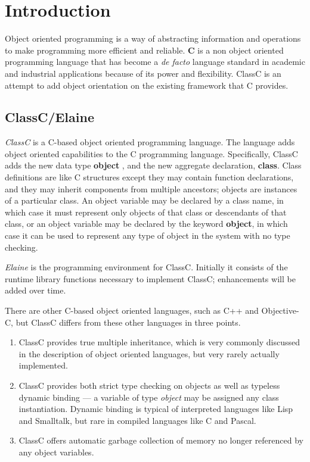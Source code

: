 \section{Introduction}
Object oriented programming is a way of abstracting information and
operations to make programming more efficient and reliable.
{\bf C}
is a non object oriented programming language that has become a {\em de facto}
language standard in academic and industrial applications because of its
power and flexibility.  ClassC is an attempt to add object orientation
on the existing framework that C provides.

\subsection{ClassC/Elaine}
{\em ClassC} is a C-based object oriented programming language.  The language
adds object oriented capabilities to the C programming language.
Specifically, ClassC adds the new data type
{\bf object}
, and the new aggregate declaration,
{\bf class}.
Class definitions are like C
structures except they may contain function declarations, and they may
inherit components from multiple ancestors; objects are instances of
a particular class.  An object variable may be declared by a class name,
in which case it must represent only objects of that class or descendants
of that class, or an object variable may be declared by the keyword
{\bf object},
in which case it can be used to represent any type of object in
the system with no type checking.

{\em Elaine}
is the programming environment for ClassC.  Initially it
consists of the runtime library functions necessary to implement
ClassC; enhancements will be added over time.

There are other C-based object oriented languages, such as C++ and
Objective-C, but ClassC differs from these other languages in three points.
\begin{enumerate}
  \item ClassC provides true multiple inheritance, which is very commonly
discussed in the description of object oriented languages, but very
rarely actually implemented.
  \item ClassC provides both strict type checking on objects
as well as typeless dynamic binding --- a variable of type
{\em object} may be assigned any class instantiation.  Dynamic binding is
typical of interpreted
languages like Lisp and Smalltalk, but rare in compiled languages like
C and Pascal.
  \item ClassC offers automatic garbage collection of memory no longer
referenced by any object variables.
\end{enumerate}

